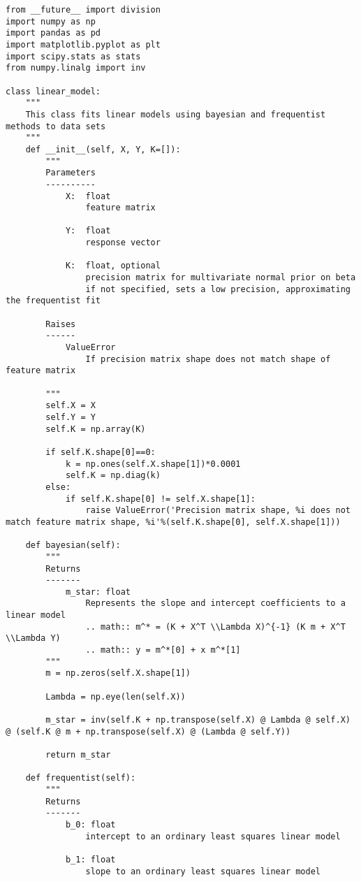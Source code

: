 \documentclass[10pt]{article}
\begin{document}
    \begin{lstlisting}
from __future__ import division
import numpy as np 
import pandas as pd
import matplotlib.pyplot as plt
import scipy.stats as stats
from numpy.linalg import inv

class linear_model:
    """
    This class fits linear models using bayesian and frequentist methods to data sets
    """
    def __init__(self, X, Y, K=[]):
        """
        Parameters
        ----------
            X:  float
                feature matrix

            Y:  float
                response vector

            K:  float, optional
                precision matrix for multivariate normal prior on beta
                if not specified, sets a low precision, approximating the frequentist fit
        
        Raises
        ------
            ValueError
                If precision matrix shape does not match shape of feature matrix

        """
        self.X = X
        self.Y = Y
        self.K = np.array(K)

        if self.K.shape[0]==0:
            k = np.ones(self.X.shape[1])*0.0001
            self.K = np.diag(k)
        else:
            if self.K.shape[0] != self.X.shape[1]:
                raise ValueError('Precision matrix shape, %i does not match feature matrix shape, %i'%(self.K.shape[0], self.X.shape[1]))

    def bayesian(self):
        """
        Returns
        -------
            m_star: float
                Represents the slope and intercept coefficients to a linear model
                .. math:: m^* = (K + X^T \\Lambda X)^{-1} (K m + X^T \\Lambda Y)
                .. math:: y = m^*[0] + x m^*[1]
        """
        m = np.zeros(self.X.shape[1])

        Lambda = np.eye(len(self.X))

        m_star = inv(self.K + np.transpose(self.X) @ Lambda @ self.X) @ (self.K @ m + np.transpose(self.X) @ (Lambda @ self.Y))

        return m_star

    def frequentist(self):
        """
        Returns
        -------
            b_0: float
                intercept to an ordinary least squares linear model

            b_1: float
                slope to an ordinary least squares linear model


\end{lstlisting}
\end{document}

